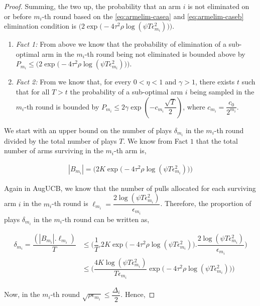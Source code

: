\begin{proof}
Summing, the two up, the probability that an arm ${i}$ is not eliminated on or before $m_{i}$-th round based on the \ref{eq:armelim-casea} and \ref{eq:armelim-caseb} elimination condition is  $\bigg(2\exp\big(-4\tau^{2}\rho\log (\psi T\epsilon_{m_{i}}^{2})\big)\bigg)$. 


\begin{enumerate}
\item \emph{Fact 1:} From above we know that the probability of elimination of a sub-optimal arm in the $m_{i}$-th round being not eliminated is bounded above by $P_{m_{i}}\leq\bigg(2\exp\big(-4\tau^{2}\rho\log (\psi T\epsilon_{m_{i}}^{2})\big)\bigg)$.
\item \emph{Fact 2:} From \cite{tolpin2012mcts} we know that, for every $0<\eta <1$ and $\gamma > 1$, there exists $t$ such that for all $T>t$ the probability of a sub-optimal arm $i$ being sampled in the $m_{i}$-th round is bounded by $P_{m_{i}}\leq 2\gamma \exp(-c_{m_{i}}\dfrac{\sqrt{T}}{2})$, where $c_{m_{i}}=\dfrac{c_{0}}{2^{m_{i}}}$.
\end{enumerate}

We start with an upper bound on the number of plays $\delta_{m_{i}}$ in the $m_{i}$-th round divided by the total number of plays $T$. We know  from Fact $1$  that the total number of arms surviving in the $m_{i}$-th arm is, 

\begin{align*}
|B_{m_{i}}|=\bigg(2K\exp\big(-4\tau^{2}\rho\log (\psi T\epsilon_{m_{i}}^{2})\big)\bigg) 
\end{align*}     

Again in AugUCB, we know that the number of pulls allocated for each surviving arm $i$ in the $m_{i}$-th round is $\ell_{m_{i}}=\dfrac{2\log (\psi T \epsilon_{m_{i}}^{2})}{\epsilon_{m_{i}}}$. Therefore, the proportion of plays $\delta_{m_{i}}$ in the $m_{i}$-th round can be written as,

\begin{align*}
\delta_{m_{i}}=\dfrac{(|B_{m_{i}}|.\ell_{m_{i}})}{T} &\leq \bigg(\dfrac{1}{T}.2K\exp\big(-4\tau^{2}\rho\log (\psi T\epsilon_{m_{i}}^{2})\big).\dfrac{2\log (\psi T \epsilon_{m_{i}}^{2})}{\epsilon_{m_{i}}}\bigg)\\
& \leq \bigg(\dfrac{4K\log (\psi T \epsilon_{m_{i}}^{2})}{T\epsilon_{m_{i}}}\exp\big(-4\tau^{2}\rho\log (\psi T\epsilon_{m_{i}}^{2})\big)\bigg)
\end{align*}

Now, in the $m_{i}$-th round $\sqrt{\rho\epsilon_{m_{i}}}\leq \dfrac{\Delta_{i}}{2}$. Hence,


\end{proof}
